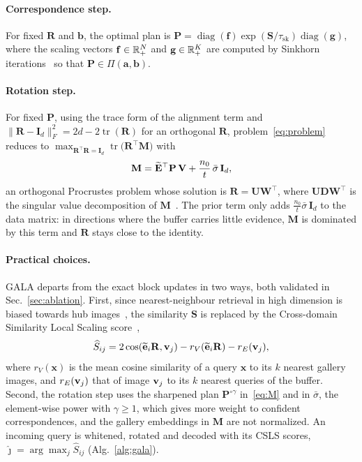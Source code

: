 \paragraph{Correspondence step.} For fixed $\mathbf{R}$ and $\mathbf{b}$, the optimal plan is
$\mathbf{P} = \operatorname{diag}(\mathbf{f})\exp(\mathbf{S}/\tau_{\mathrm{sk}})\operatorname{diag}(\mathbf{g})$,
where the scaling vectors $\mathbf{f} \in {\mathbb R}_+^N$ and $\mathbf{g} \in {\mathbb R}_+^K$ are computed by Sinkhorn
iterations~\cite{sinkhorn1964,cuturi2013sinkhorn} so that
$\mathbf{P} \in \Pi(\mathbf{a},\mathbf{b})$.

\paragraph{Rotation step.} For fixed $\mathbf{P}$, using the trace form of the alignment term and
$\|\mathbf{R}-\mathbf{I}_d\|_F^2 = 2d - 2\operatorname{tr}(\mathbf{R})$ for an orthogonal
$\mathbf{R}$, problem~\eqref{eq:problem} reduces to
$\max_{\mathbf{R}^\top\mathbf{R} = \mathbf{I}_d}\operatorname{tr}\big(\mathbf{R}^\top\mathbf{M}\big)$ with
%
\begin{equation}
  \mathbf{M} = \widetilde{{\bf E}}^\top\mathbf{P}\,{\bf V} + \frac{n_0}{t}\,\bar\sigma\,\mathbf{I}_d ,
  \label{eq:M}
\end{equation}
%
an orthogonal Procrustes problem whose solution is $\mathbf{R} = \mathbf{U}\mathbf{W}^\top$,
where $\mathbf{U}\mathbf{D}\mathbf{W}^\top$ is the singular value decomposition of
$\mathbf{M}$~\cite{schonemann1966procrustes}. The prior term only adds
$\tfrac{n_0}{t}\bar\sigma\,\mathbf{I}_d$ to the data matrix: in directions where
the buffer carries little evidence, $\mathbf{M}$ is dominated by this term and
$\mathbf{R}$ stays close to the identity.

\paragraph{Practical choices.}
GALA departs from the exact block updates in two ways, both validated in Sec.~\ref{sec:ablation}.
First, since nearest-neighbour retrieval in high dimension is biased towards
hub images~\cite{radovanovic2010hubs}, the similarity $\mathbf{S}$ is replaced by the
Cross-domain Similarity Local Scaling score~\cite{conneau2018muse},
%
\begin{equation}
  \widehat{S}_{ij} = 2\cos(\widetilde{{\bf e}}_i\mathbf{R}, {\bf v}_j)
  - r_V(\widetilde{{\bf e}}_i\mathbf{R}) - r_E({\bf v}_j),
  \label{eq:csls}
\end{equation}
%
where $r_V(\mathbf{x})$ is the mean cosine similarity of a query $\mathbf{x}$ to
its $k$ nearest gallery images, and $r_E({\bf v}_j)$ that of image ${\bf v}_j$ to its $k$
nearest queries of the buffer. Second, the rotation step uses the sharpened plan
$\mathbf{P}^{\circ\gamma}$ in~\eqref{eq:M} and in $\bar\sigma$, the element-wise power with
$\gamma \ge 1$, which gives more weight to confident correspondences, and the
gallery embeddings in $\mathbf{M}$ are not normalized. An
incoming query is whitened, rotated and decoded with its CSLS scores,
$\hat\jmath = \arg\max_j \widehat{S}_{ij}$ (Alg.~\ref{alg:gala}).
